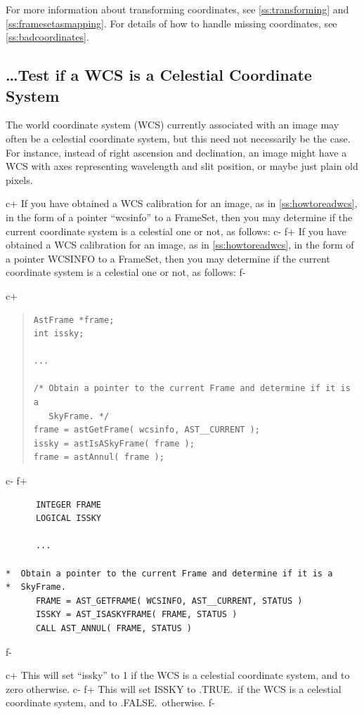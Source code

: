 \documentclass[twoside,11pt]{article}
\newcommand{\secref}[1]{\S\ref{#1}}
\renewcommand{\secref}[1]{\ref{#1}}
\begin{document}
For more information about transforming coordinates, see
\secref{ss:transforming} and \secref{ss:framesetasmapping}. For
details of how to handle missing coordinates, see
\secref{ss:badcoordinates}.

\subsection{\label{ss:howtotestforcelestial}\ldots Test if a WCS is a Celestial Coordinate System}

The world coordinate system (WCS) currently associated with an image
may often be a celestial coordinate system, but this need not
necessarily be the case. For instance, instead of right ascension and
declination, an image might have a WCS with axes representing
wavelength and slit position, or maybe just plain old pixels.

c+
If you have obtained a WCS calibration for an image, as in
\secref{ss:howtoreadwcs}, in the form of a pointer ``wcsinfo'' to a
FrameSet, then you may determine if the current coordinate system is a
celestial one or not, as follows:
c-
f+
If you have obtained a WCS calibration for an image, as in
\secref{ss:howtoreadwcs}, in the form of a pointer WCSINFO to a
FrameSet, then you may determine if the current coordinate system is a
celestial one or not, as follows:
f-

c+
\begin{quote}
\small
\begin{verbatim}
AstFrame *frame;
int issky;

...

/* Obtain a pointer to the current Frame and determine if it is a
   SkyFrame. */
frame = astGetFrame( wcsinfo, AST__CURRENT );
issky = astIsASkyFrame( frame );
frame = astAnnul( frame );
\end{verbatim}
\normalsize
\end{quote}
c-
f+
\small
\begin{verbatim}
      INTEGER FRAME
      LOGICAL ISSKY

      ...

*  Obtain a pointer to the current Frame and determine if it is a
*  SkyFrame.
      FRAME = AST_GETFRAME( WCSINFO, AST__CURRENT, STATUS )
      ISSKY = AST_ISASKYFRAME( FRAME, STATUS )
      CALL AST_ANNUL( FRAME, STATUS )
\end{verbatim}
\normalsize
f-

c+
This will set ``issky'' to 1 if the WCS is a celestial coordinate
system, and to zero otherwise.
c-
f+
This will set ISSKY to .TRUE.\ if the WCS is a celestial coordinate
system, and to .FALSE.\ otherwise.
f-
\end{document}
